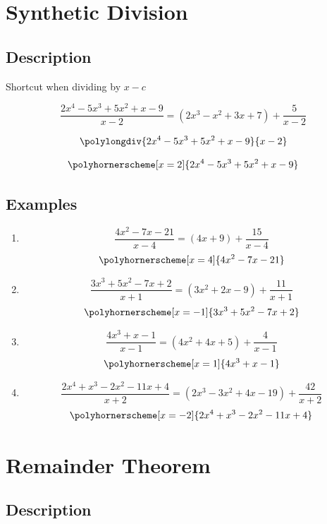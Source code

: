 \documentclass{exam}
\begin{document}
  \section{Synthetic Division}

  \subsection{Description}

  Shortcut when dividing by $x - c$

  \[ \frac{2x^4 - 5x^3 + 5x^2 + x - 9}{x - 2} = (2x^3 - x^2 + 3x + 7) + \frac{5}{x - 2} \]

  \[ \polylongdiv{2x^4 - 5x^3 + 5x^2 + x - 9}{x - 2} \]

  \[ \polyhornerscheme[x = 2]{2x^4 - 5x^3 + 5x^2 + x - 9} \]

  \pagebreak

  \subsection{Examples}
  \begin{enumerate}
    \item 
      \[ \frac{4x^2 - 7x - 21}{x - 4} = (4x + 9) + \frac{15}{x - 4} \]
      \[ \polyhornerscheme[x = 4]{4x^2 - 7x - 21} \]

    \item 
      \[ \frac{3x^3 + 5x^2 - 7x + 2}{x + 1} = (3x^2 + 2x - 9) + \frac{11}{x + 1} \]
      \[ \polyhornerscheme[x = -1]{3x^3 + 5x^2 - 7x + 2} \]
      
    \item 
      \[ \frac{4x^3 + x - 1}{x - 1} = (4x^2 + 4x + 5) + \frac{4}{x - 1} \]
      \[ \polyhornerscheme[x = 1]{4x^3 + x - 1} \]
      
    \item 
      \[ \frac{2x^4 + x^3 - 2x^2 - 11x + 4}{x + 2} = (2 x^3-3 x^2+4 x-19) + \frac{42}{x + 2} \]
      \[ \polyhornerscheme[x = -2]{2 x^4 + x^3 - 2 x^2 - 11x + 4} \]

  \end{enumerate}

  \section{Remainder Theorem}
  \subsection{Description}
\end{document}
